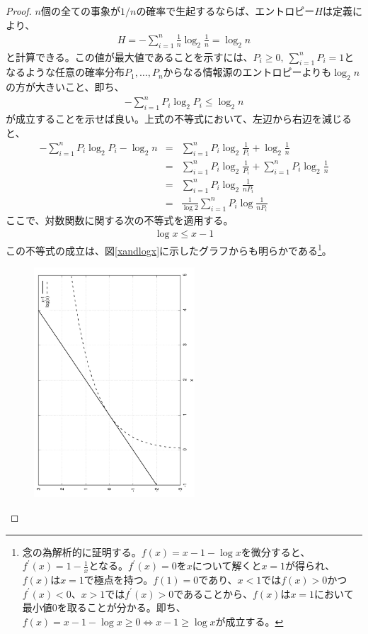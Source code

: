 \documentclass[uplatex,dvipdfmx,b5j,10pt]{jsbook}
\theoremstyle{definition}
\begin{document}
\begin{proof}
  $n$個の全ての事象が$1/n$の確率で生起するならば、エントロピー$H$は定義により、
  \begin{eqnarray*}
    H = -\sum_{i = 1}^{n} \frac{1}{n} \log_{2} \frac{1}{n} = \log_{2} n
  \end{eqnarray*}
  と計算できる。この値が最大値であることを示すには、$P_{i} \geq 0,\ \sum_{i = 1}^{n} P_{i} = 1$となるような任意の確率分布$P_{1},\dots,P_{n}$からなる情報源のエントロピーよりも$\log_{2} n$の方が大きいこと、即ち、
  \begin{eqnarray*}
    -\sum_{i = 1}^{n} P_{i} \log_{2} P_{i} \leq \log_{2} n
  \end{eqnarray*}
  が成立することを示せば良い。上式の不等式において、左辺から右辺を減じると、
  \begin{eqnarray*}
    -\sum_{i = 1}^{n} P_{i} \log_{2} P_{i} - \log_{2} n &=& \sum_{i = 1}^{n} P_{i} \log_{2} \frac{1}{P_{i}} + \log_{2} \frac{1}{n} \\
    &=& \sum_{i = 1}^{n} P_{i} \log_{2} \frac{1}{P_{i}} + \sum_{i = 1}^{n} P_{i} \log_{2} \frac{1}{n}  \\
    &=& \sum_{i = 1}^{n} P_{i} \log_{2} \frac{1}{n P_{i}} \\
    &=& \frac{1}{\log 2} \sum_{i = 1}^{n} P_{i} \log \frac{1}{n P_{i}}
  \end{eqnarray*}
  ここで、対数関数に関する次の不等式を適用する。
  \begin{eqnarray} 
    \log x \leq x - 1 \label{log_function_characteristics}
  \end{eqnarray}
  この不等式の成立は、図\ref{xandlogx}に示したグラフからも明らかである\footnote{念の為解析的に証明する。$f(x) = x-1-\log x$を微分すると、$f^{\prime}(x) = 1 - \frac{1}{x}$となる。$f^{\prime}(x) = 0$を$x$について解くと$x=1$が得られ、$f(x)$は$x=1$で極点を持つ。$f(1) = 0$であり、$x < 1$では$f(x) > 0$かつ$f^{\prime}(x) < 0$、$x > 1$では$f^{\prime}(x) > 0$であることから、$f(x)$は$x=1$において最小値$0$を取ることが分かる。即ち、$f(x) = x-1-\log x \geq 0 \iff x-1 \geq \log x $が成立する。}。
  \begin{figure}[htbp]
    \begin{center}
      \includegraphics[width=60mm,angle=-90]{./figs/x-1_logx.png}

\end{center}
\end{figure}
\end{proof}
\end{document}
